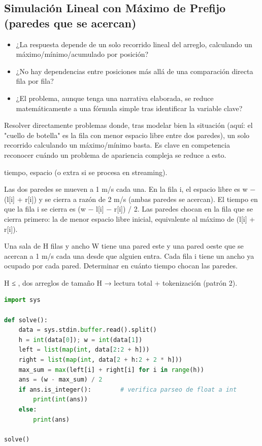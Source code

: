 \subsection{Simulación Lineal con Máximo de Prefijo (paredes que se acercan)}
\label{alg:7-3}


\begin{itemize}
\item ¿La respuesta depende de un solo recorrido lineal del arreglo, calculando un máximo/mínimo/acumulado por posición?
\item ¿No hay dependencias entre posiciones más allá de una comparación directa fila por fila?
\item ¿El problema, aunque tenga una narrativa elaborada, se reduce matemáticamente a una fórmula simple tras identificar la variable clave?
\end{itemize}

 Resolver directamente problemas donde, tras modelar bien la situación (aquí: el "cuello de botella" es la fila con menor espacio libre entre dos paredes), un solo recorrido  calculando un máximo/mínimo basta. Es clave en competencia reconocer cuándo un problema de apariencia compleja se reduce a esto.

  tiempo,  espacio (o  extra si se procesa en streaming).

 Las dos paredes se mueven a 1 m/s cada una. En la fila i, el espacio libre es w − (l[i] + r[i]) y se cierra a razón de 2 m/s (ambas paredes se acercan). El tiempo en que la fila i se cierra es (w − l[i] − r[i]) / 2. Las paredes chocan en la fila que se cierra primero: la de menor espacio libre inicial, equivalente al máximo de (l[i] + r[i]).


Una sala de H filas y ancho W tiene una pared este y una pared oeste que se acercan a 1 m/s cada una desde que alguien entra. Cada fila i tiene un ancho ya ocupado por cada pared. Determinar en cuánto tiempo chocan las paredes.

 H ≤ , dos arreglos de tamaño H → lectura total + tokenización (patrón 2).


\begin{lstlisting}[language=Python]
import sys
 
def solve():
    data = sys.stdin.buffer.read().split()
    h = int(data[0]); w = int(data[1])
    left = list(map(int, data[2:2 + h]))
    right = list(map(int, data[2 + h:2 + 2 * h]))
    max_sum = max(left[i] + right[i] for i in range(h))
    ans = (w - max_sum) / 2
    if ans.is_integer():        # verifica parseo de float a int
        print(int(ans))
    else:
        print(ans)

solve()
\end{lstlisting}
